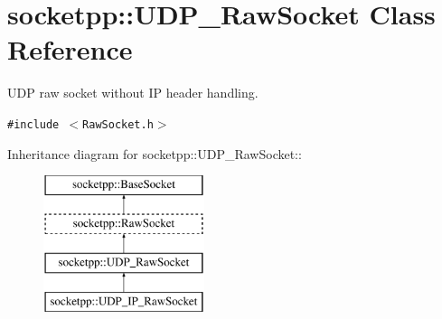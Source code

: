 \hypertarget{classsocketpp_1_1UDP__RawSocket}{
\section{socketpp::UDP\_\-RawSocket Class Reference}
\label{classsocketpp_1_1UDP__RawSocket}
}
UDP raw socket without IP header handling.  


{\tt \#include $<$RawSocket.h$>$}

Inheritance diagram for socketpp::UDP\_\-RawSocket::\begin{figure}[H]
\begin{center}
\leavevmode
\includegraphics[height=4cm]{classsocketpp_1_1UDP__RawSocket}
\end{center}
\end{figure}
